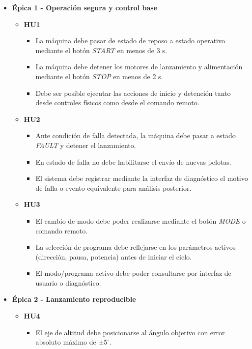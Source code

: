 ﻿\documentclass[
11pt, %
]{charter}
\begin{document}
\begin{itemize}
  \item \textbf{\'{E}pica 1 - Operación segura y control base}
    \begin{itemize}
      \item \textbf{HU1}
      \begin{itemize}
        \item La máquina debe pasar de estado de reposo a estado operativo mediante el botón \textit{START} en menos de 3 s.
        \item La máquina debe detener los motores de lanzamiento y alimentación mediante el botón \textit{STOP} en menos de 2 s.
        \item Debe ser posible ejecutar las acciones de inicio y detención tanto desde controles físicos como desde el comando remoto.
      \end{itemize}
      \item \textbf{HU2}
      \begin{itemize}
        \item Ante condición de falla detectada, la máquina debe pasar a estado \textit{FAULT} y detener el lanzamiento.
        \item En estado de falla no debe habilitarse el envío de nuevas pelotas.
        \item El sistema debe registrar mediante la interfaz de diagnóstico el motivo de falla o evento equivalente para análisis posterior.
      \end{itemize}
      \item \textbf{HU3}
      \begin{itemize}
        \item El cambio de modo debe poder realizarse mediante el botón \textit{MODE} o comando remoto.
        \item La selección de programa debe reflejarse en los parámetros activos (dirección, pausa, potencia) antes de iniciar el ciclo.
        \item El modo/programa activo debe poder consultarse por interfaz de usuario o diagnóstico.
      \end{itemize}
    \end{itemize}
  \item \textbf{\'{E}pica 2 - Lanzamiento reproducible}
    \begin{itemize}
      \item \textbf{HU4}
      \begin{itemize}
        \item El eje de altitud debe posicionarse al ángulo objetivo con error absoluto máximo de $\pm 5^\circ$.

\end{itemize}
\end{itemize}
\end{itemize}
\end{document}
